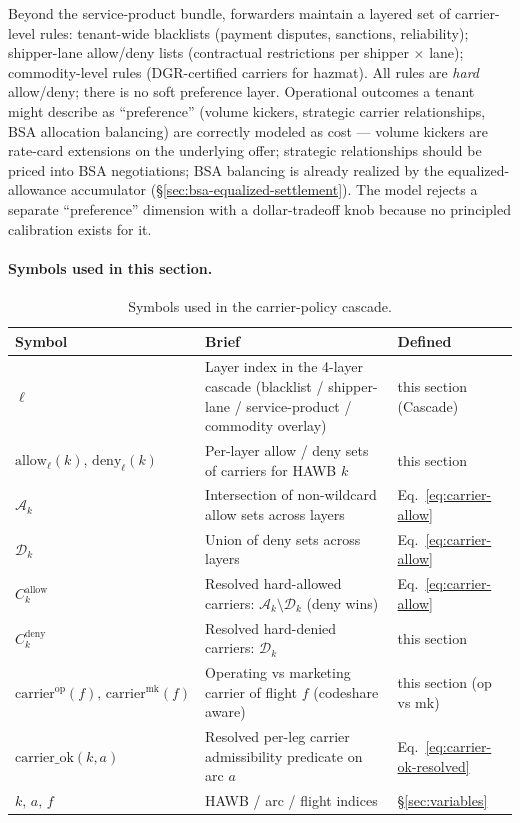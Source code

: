 \documentclass[11pt,a4paper]{article}
\theoremstyle{definition}
\begin{document}
Beyond the service-product bundle, forwarders maintain a layered set of
carrier-level rules: tenant-wide blacklists (payment disputes, sanctions,
reliability); shipper-lane allow/deny lists (contractual restrictions per
shipper $\times$ lane); commodity-level rules (DGR-certified carriers for
hazmat). All rules are \emph{hard} allow/deny; there is no soft preference
layer. Operational outcomes a tenant might describe as ``preference''
(volume kickers, strategic carrier relationships, BSA allocation balancing)
are correctly modeled as cost --- volume kickers are rate-card extensions
on the underlying offer; strategic relationships should be priced into BSA
negotiations; BSA balancing is already realized by the equalized-allowance
accumulator (\S\ref{sec:bsa-equalized-settlement}). The model rejects
a separate ``preference'' dimension with a dollar-tradeoff knob because no
principled calibration exists for it.

\paragraph{Symbols used in this section.}
\begin{table}[H]
\centering
\caption{Symbols used in the carrier-policy cascade.}
\label{tab:carrier-policy-syms}
\begin{tabular}{lp{9cm}p{3.5cm}}
\toprule
Symbol & Brief & Defined \\
\midrule
$\ell$ & Layer index in the 4-layer cascade (blacklist / shipper-lane / service-product / commodity overlay) & this section (Cascade) \\
$\text{allow}_\ell(k),\, \text{deny}_\ell(k)$ & Per-layer allow / deny sets of carriers for HAWB $k$ & this section \\
$\mathcal{A}_k$ & Intersection of non-wildcard allow sets across layers & Eq.~\ref{eq:carrier-allow} \\
$\mathcal{D}_k$ & Union of deny sets across layers & Eq.~\ref{eq:carrier-allow} \\
$C_k^{\text{allow}}$ & Resolved hard-allowed carriers: $\mathcal{A}_k \setminus \mathcal{D}_k$ (deny wins) & Eq.~\ref{eq:carrier-allow} \\
$C_k^{\text{deny}}$ & Resolved hard-denied carriers: $\mathcal{D}_k$ & this section \\
$\text{carrier}^{\text{op}}(f),\, \text{carrier}^{\text{mk}}(f)$ & Operating vs marketing carrier of flight $f$ (codeshare aware) & this section (op vs mk) \\
$\text{carrier\_ok}(k, a)$ & Resolved per-leg carrier admissibility predicate on arc $a$ & Eq.~\ref{eq:carrier-ok-resolved} \\
$k,\, a,\, f$ & HAWB / arc / flight indices & \S\ref{sec:variables} \\
\bottomrule
\end{tabular}
\end{table}
\end{document}
